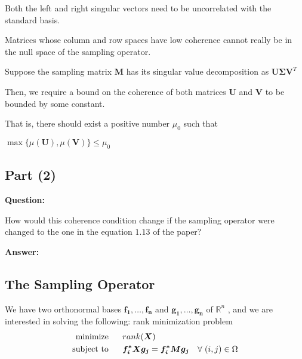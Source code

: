 \documentclass[fleqn, 11pt]{article}
\newcommand{\bs}[1]{\boldsymbol{#1}}
\begin{document}
\smallskip

Both the left and right singular vectors need to be uncorrelated with the standard basis.

\smallskip

Matrices whose column and row spaces have
low coherence cannot really be in the null space of the sampling operator.

\smallskip

Suppose the sampling matrix $\bs{M}$ has its singular value decomposition as $\bs{U}\bs{\Sigma}\bs{V}^T$

Then, we require a bound on the coherence of both matrices $\bs{U}$ and $\bs{V}$ to be bounded by some constant.

\bigskip 

That is, there should exist a positive number $\mu_0$ such that 
\begin{center}
    $\max\{ \mu(\bs{U}) , \mu(\bs{V}) \} \leq \mu_0$
\end{center}

\newpage


\subsection*{Part (2)}

\textbf{Question: }

\smallskip

How would
this coherence condition change if the sampling operator 
were changed to the one in the equation $1.13$ of the paper?

\hrulefill

\medskip

\textbf{Answer: }

\subsection*{The Sampling Operator}

We have two orthonormal bases $\bs{f_1 , \ldots , f_n}$ and $\bs{g_1 , \ldots , g_n}$
 of $\mathbb{R}^n$ , and  we are interested in solving the following: rank minimization problem 
 \begin{align*}
     \text{minimize  \hspace{10pt}  } &rank(\bs{X}) \\
     \text{subject to \hspace{10pt} }  & \bs{f_i^* X g_j} = \bs{f_i^* M g_j} \hspace{10pt} \forall \hspace{3pt} (i,j) \in \Omega
 \end{align*}
 
\end{document}
